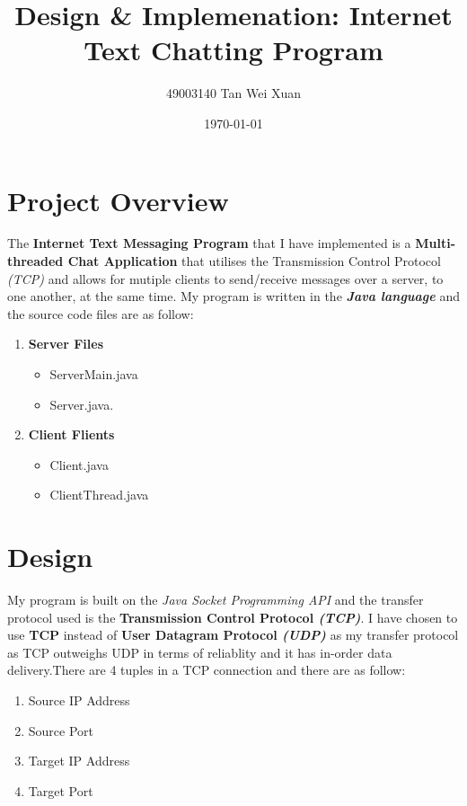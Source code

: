 \documentclass[a4paper,11pt]{article}
\begin{document}
\title{\vspace{-1.0cm}\textbf{Design \& Implemenation: \linebreak Internet Text Chatting Program}}
\author{49003140 Tan Wei Xuan}
\date{\today}
\maketitle

\section{Project Overview}
The\textbf{ Internet Text Messaging Program} that I have implemented is a \textbf{Multi-threaded Chat Application} that utilises the Transmission Control Protocol \textit{(TCP)} and allows for mutiple clients to send/receive messages over a server, to one another, at the same time. My program is written in the \textit{\textbf{Java language}} and the source code files are as follow:
\begin{enumerate}
	\item \textbf{Server Files}
\begin{itemize}
  	\item ServerMain.java
 	\item Server.java.
\end{itemize}
	\item \textbf{Client Flients}
\begin{itemize}
  	\item Client.java
 	\item ClientThread.java
\end{itemize}
\end{enumerate}

\section{Design}
My program is built on the  \textit{Java Socket Programming API} and the transfer protocol used is the \textbf{Transmission Control Protocol \textit{(TCP)}}.
I have chosen to use \textbf{TCP} instead of \textbf{User Datagram Protocol \textit{(UDP)}} as my transfer protocol as TCP outweighs UDP in terms of reliablity and it has in-order data delivery.There are 4 tuples in a TCP connection and there are as follow:
\begin{enumerate}
  \item Source IP Address
  \item Source Port
  \item Target IP Address
  \item Target Port
\end{enumerate}
\end{document}
